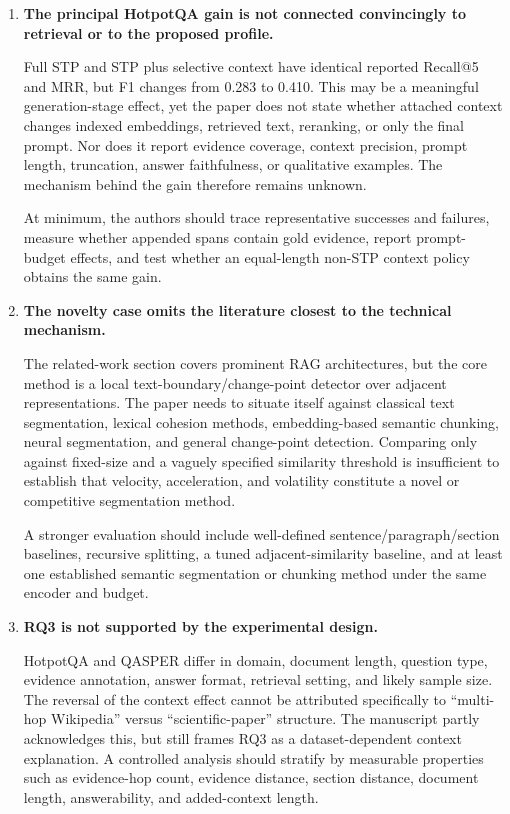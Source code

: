 \documentclass[11pt]{article}
\begin{document}
\begin{enumerate}
  \item \textbf{The principal HotpotQA gain is not connected convincingly to retrieval or to the proposed profile.}

  Full STP and STP plus selective context have identical reported Recall@5 and MRR, but F1 changes from 0.283 to 0.410. This may be a meaningful generation-stage effect, yet the paper does not state whether attached context changes indexed embeddings, retrieved text, reranking, or only the final prompt. Nor does it report evidence coverage, context precision, prompt length, truncation, answer faithfulness, or qualitative examples. The mechanism behind the gain therefore remains unknown.

  At minimum, the authors should trace representative successes and failures, measure whether appended spans contain gold evidence, report prompt-budget effects, and test whether an equal-length non-STP context policy obtains the same gain.

  \item \textbf{The novelty case omits the literature closest to the technical mechanism.}

  The related-work section covers prominent RAG architectures, but the core method is a local text-boundary/change-point detector over adjacent representations. The paper needs to situate itself against classical text segmentation, lexical cohesion methods, embedding-based semantic chunking, neural segmentation, and general change-point detection. Comparing only against fixed-size and a vaguely specified similarity threshold is insufficient to establish that velocity, acceleration, and volatility constitute a novel or competitive segmentation method.

  A stronger evaluation should include well-defined sentence/paragraph/section baselines, recursive splitting, a tuned adjacent-similarity baseline, and at least one established semantic segmentation or chunking method under the same encoder and budget.

  \item \textbf{RQ3 is not supported by the experimental design.}

  HotpotQA and QASPER differ in domain, document length, question type, evidence annotation, answer format, retrieval setting, and likely sample size. The reversal of the context effect cannot be attributed specifically to ``multi-hop Wikipedia'' versus ``scientific-paper'' structure. The manuscript partly acknowledges this, but still frames RQ3 as a dataset-dependent context explanation. A controlled analysis should stratify by measurable properties such as evidence-hop count, evidence distance, section distance, document length, answerability, and added-context length.


\end{enumerate}
\end{document}
